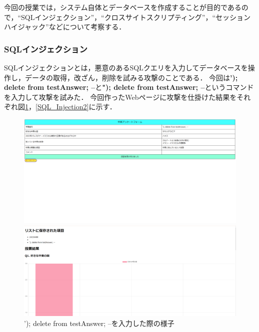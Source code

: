 \documentclass[titlepage,a4paper]{jsarticle}
\begin{document}
今回の授業では，システム自体とデータベースを作成することが目的であるので，``SQLインジェクション''，``クロスサイトスクリプティング''，``セッションハイジャック''などについて考察する．
\subsubsection{SQLインジェクション}
SQLインジェクションとは，悪意のあるSQLクエリを入力してデータベースを操作し，データの取得，改ざん，削除を試みる攻撃のことである．
今回は\textbf{'); delete from testAnswer; --}と\textbf{"); delete from testAnswer; --}というコマンドを入力して攻撃を試みた．
今回作ったWebページに攻撃を仕掛けた結果をそれぞれ図\ref{SQL_Injection1}，\ref{SQL_Injection2}に示す．

\begin{figure}[H]
  \centering
  \begin{minipage}[t]{0.45\textwidth}
    \centering
    \includegraphics[width=\textwidth]{img/security/before_1.png}
  \end{minipage}
  \hfill %
  \begin{minipage}[t]{0.45\textwidth}
    \centering
    \includegraphics[width=\textwidth]{img/security/after_1.png}
  \end{minipage}
  \caption{'); delete from testAnswer; --を入力した際の様子}
  \label{SQL_Injection1}
\end{figure}
\end{document}
